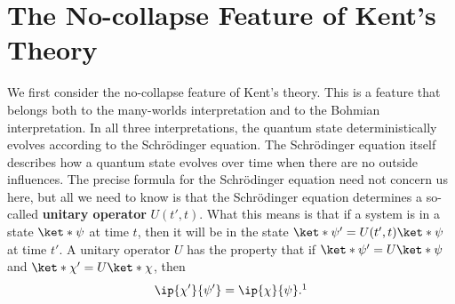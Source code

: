 \documentclass[12pt]{report}
\begin{document}
\section{The No-collapse Feature of Kent's Theory}
We first consider the no-collapse feature of Kent's theory. This is a feature that belongs both to the many-worlds interpretation and to the Bohmian interpretation. In all three interpretations, the quantum state deterministically evolves according to the Schr\"{o}dinger equation. The Schr\"{o}dinger equation itself describes how a quantum state evolves over time when there are no outside influences. The precise formula for the Schr\"{o}dinger equation need not concern us here, but all we need to know is that the Schr\"{o}dinger equation determines a so-called \textbf{unitary operator} $U(t',t)$. %
%
What this means is that if a system is in a state $\ket*{\psi}$ at time $t$, then it will be in the state $\ket*{\psi'}=U(t',t)\ket*{\psi}$
at time $t'$. A unitary operator $U$ has the property that if $\ket*{\psi'}=U\ket*{\psi}$ and $\ket*{\chi'}=U\ket*{\chi}$, then 
\begin{equation}\label{unitarycond}
\ip{\chi'}{\psi'}=\ip{\chi}{\psi}.\protect\footnotemark
\end{equation} 
\end{document}
